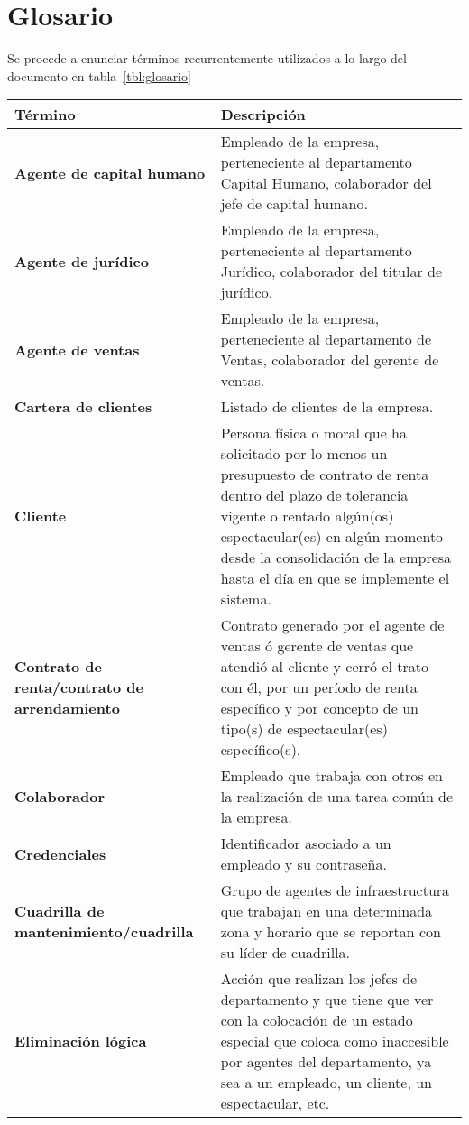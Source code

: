 \chapter{Glosario}	
Se procede a enunciar términos recurrentemente utilizados a lo largo del documento en tabla~\ref{tbl:glosario}
\begin{longtable}[H]{m{4cm}m{8cm}}
\toprule
\centering \textbf{Término} & \centering  \textbf{Descripción} \tabularnewline
\midrule

\textbf{Agente de capital humano} & Empleado de la empresa, perteneciente al departamento Capital Humano, colaborador del jefe de capital humano. \tabularnewline

\textbf{Agente de jurídico} & Empleado de la empresa, perteneciente al departamento Jurídico, colaborador del titular de jurídico. \tabularnewline

\textbf{Agente de ventas} & Empleado de la empresa, perteneciente al departamento de Ventas, colaborador del gerente de ventas. \tabularnewline

\textbf{Cartera de clientes} & Listado de clientes de la empresa. \tabularnewline

\textbf{Cliente} & Persona física o moral que ha solicitado por lo menos un presupuesto de contrato de renta dentro del plazo de tolerancia vigente o rentado algún(os) espectacular(es) en algún momento desde la consolidación de la empresa hasta el día en que se implemente el sistema. \tabularnewline

\textbf{Contrato de renta/contrato de arrendamiento} & Contrato generado por el agente de ventas ó gerente de ventas que atendió al cliente y cerró el trato con él, por un período de renta específico y por concepto de un tipo(s) de espectacular(es) específico(s). \tabularnewline

\textbf{Colaborador} & Empleado que trabaja con otros en la realización de una tarea común de la empresa. \tabularnewline

\textbf{Credenciales} & Identificador asociado a un empleado y su contraseña. \tabularnewline

\textbf{Cuadrilla de mantenimiento/cuadrilla} & Grupo de agentes de infraestructura que trabajan en una determinada zona y horario que se reportan con su líder de cuadrilla. \tabularnewline


\textbf{Eliminación lógica} & Acción que realizan los jefes de departamento y que tiene que ver con la colocación de un estado especial que coloca como inaccesible por agentes del departamento, ya sea a un empleado, un cliente, un espectacular, etc. \tabularnewline


\end{longtable}
